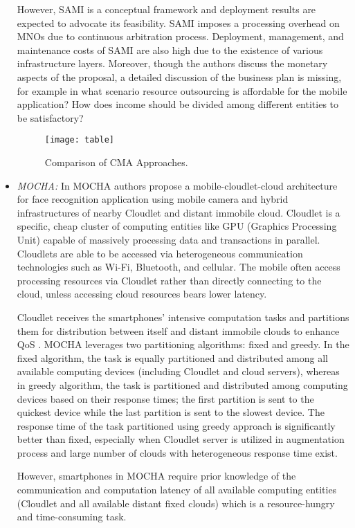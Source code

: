\documentclass[publish]{IEEEtran}
\begin{document}
\begin{itemize}
However, SAMI is a conceptual framework and deployment results are expected to advocate its feasibility. SAMI  imposes a processing overhead on MNOs due to continuous arbitration process. Deployment, management, and maintenance costs of SAMI are also high due to the existence of various infrastructure layers. Moreover, though the authors discuss the monetary aspects of the proposal, a detailed discussion of the business plan is missing, for example in what scenario resource outsourcing is affordable for the mobile application? How does income should be divided among different entities to be satisfactory? 
\begin{figure*} [tbph]
\centering
\texttt{[image: table]}
\caption{Comparison of CMA Approaches.} \label{table colored}
\end{figure*}

\item \textit{MOCHA:} In MOCHA \cite{Soyata2012} authors propose a mobile-cloudlet-cloud architecture for face recognition application using mobile camera and hybrid infrastructures of nearby Cloudlet and distant immobile cloud. Cloudlet is a specific, cheap cluster of computing entities like GPU (Graphics Processing Unit) capable of massively processing data and transactions in parallel. Cloudlets are able to be accessed via heterogeneous communication technologies such as Wi-Fi, Bluetooth, and cellular. The mobile often access processing resources via Cloudlet rather than directly connecting to the cloud, unless accessing cloud resources bears lower latency.

Cloudlet receives the smartphones’ intensive computation tasks and partitions them for distribution between itself and distant immobile clouds to enhance QoS  \cite{Satyanarayanan2009}. MOCHA leverages two partitioning algorithms: fixed and greedy. In the fixed algorithm, the task is equally partitioned and distributed among all available computing devices (including Cloudlet and cloud servers), whereas in greedy algorithm, the task is partitioned and distributed among computing devices based on their response times; the first partition is sent to the quickest device while the last partition is sent to the slowest device. The response time of the task partitioned using greedy approach is significantly better than fixed, especially when Cloudlet server is utilized in augmentation process and large number of clouds with heterogeneous response time exist.

However, smartphones in MOCHA require prior knowledge of the communication and computation latency of all available computing entities (Cloudlet and all available distant fixed clouds) which is a resource-hungry and time-consuming task.
	
\end{itemize}
\end{document}
